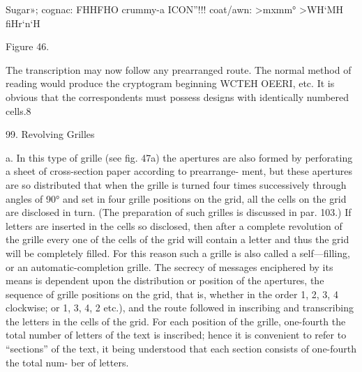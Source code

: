 Sugar»;
cognac:
FHHFHO
crummy-a
ICON”!!!
coat/awn:
>mxmm°
>WH‘MH
ﬁHr‘n‘H

 

 

 

 

 

 

 

 

 

 

 

 

 

 

 

 

 

 

 

Figure 46.

The transcription may now follow any prearranged route. The normal
method of reading would produce the cryptogram beginning WCTEH
OEERI, etc. It is obvious that the correspondents must possess designs
with identically numbered cells.8

99. Revolving Grilles

a. In this type of grille (see ﬁg. 47a) the apertures are also formed
by perforating a sheet of cross-section paper according to prearrange-
ment, but these apertures are so distributed that when the grille is
turned four times successively through angles of 90° and set in four
grille positions on the grid, all the cells on the grid are disclosed in turn.
(The preparation of such grilles is discussed in par. 103.) If letters are
inserted in the cells so disclosed, then after a complete revolution of the
grille every one of the cells of the grid will contain a letter and thus the
grid will be completely ﬁlled. For this reason such a grille is also called
a self—ﬁlling, or an automatic-completion grille. The secrecy of messages
enciphered by its means is dependent upon the distribution or position of
the apertures, the sequence of grille positions on the grid, that is, whether
in the order 1, 2, 3, 4 clockwise; or 1, 3, 4, 2 etc.), and the route followed
in inscribing and transcribing the letters in the cells of the grid. For each
position of the grille, one-fourth the total number of letters of the text
is inscribed; hence it is convenient to refer to “sections” of the text, it
being understood that each section consists of one-fourth the total num-
ber of letters.

